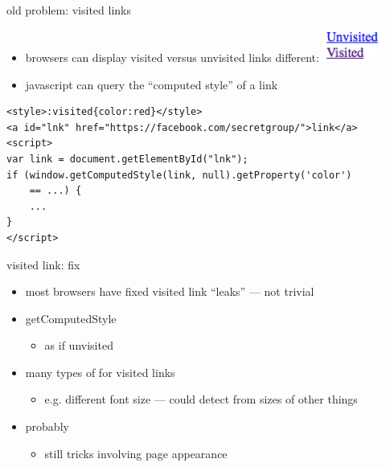 
\begin{frame}[fragile,label=visitedLinks]{old problem: visited links}
    \begin{itemize}
    \item browsers can display visited versus unvisited links different:
        \includegraphics[width=2cm]{../web/visitedunvisited}
    \item javascript can query the ``computed style'' of a link
    \end{itemize}
\begin{verbatim}
<style>:visited{color:red}</style>
<a id="lnk" href="https://facebook.com/secretgroup/">link</a>
<script>
var link = document.getElementById("lnk");
if (window.getComputedStyle(link, null).getProperty('color')
    == ...) {
    ...
}
</script>
\end{verbatim}
\end{frame}

\begin{frame}[fragile,label=visitedLinksFix]{visited link: fix}
    \begin{itemize}
    \item most browsers have fixed visited link ``leaks'' --- not trivial
    \item getComputedStyle 
        \begin{itemize}
        \item as if unvisited
        \end{itemize}
    \item many types of  for visited links
        \begin{itemize}
        \item e.g. different font size --- could detect from sizes of other things
        \end{itemize}
    \item probably 
        \begin{itemize}
            \item still tricks involving page appearance
        \end{itemize}
    \end{itemize}
\end{frame}
